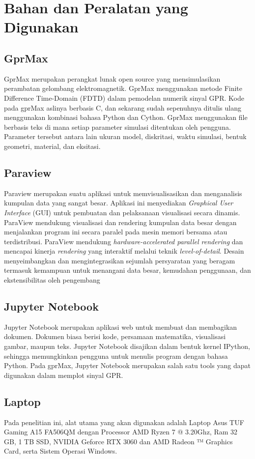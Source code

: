 \section{Bahan dan Peralatan yang Digunakan}
\label{sec:bahanPeralatan}

\subsection{GprMax}
\label{subsec:GprMax}

GprMax merupakan perangkat lunak open source yang mensimulasikan perambatan gelombang elektromagnetik. 
GprMax menggunakan metode Finite Difference Time-Domain (FDTD) dalam pemodelan numerik sinyal GPR. 
Kode pada gprMax aslinya berbasis C, dan sekarang sudah sepenuhnya ditulis ulang menggunakan kombinasi bahasa Python dan Cython. 
GprMax menggunakan file berbasis teks di mana setiap parameter simulasi ditentukan oleh pengguna. 
Parameter tersebut antara lain ukuran model, diskritasi, waktu simulasi, bentuk geometri, material, dan eksitasi.

\subsection{Paraview}
Paraview merupakan suatu aplikasi untuk memvisualisasikan dan menganalisis kumpulan data yang sangat besar. 
Aplikasi ini menyediakan \emph{Graphical User Interface} (GUI) untuk pembuatan dan pelaksanaan visualisasi secara dinamis. 
ParaView mendukung visualisasi dan rendering kumpulan data besar dengan menjalankan program ini secara paralel pada mesin memori bersama atau terdistribusi. 
ParaView mendukung \emph{hardware-accelerated parallel rendering} dan mencapai kinerja \emph{rendering} yang interaktif melalui teknik \emph{level-of-detail}. 
Desain menyeimbangkan dan mengintegrasikan sejumlah persyaratan yang beragam termasuk kemampuan untuk menangani data besar, kemudahan penggunaan, dan ekstensibilitas oleh pengembang \parencite{paraview}

\subsection{Jupyter Notebook}
\label{subsec:jupyter}

Jupyter Notebook merupakan aplikasi web untuk membuat dan membagikan dokumen. 
Dokumen biasa berisi kode, persamaan matematika, visualisasi gambar, maupun teks. 
Jupyter Notebook disajikan dalam bentuk kernel IPython, sehingga memungkinkan pengguna untuk menulis program dengan bahasa Python. 
Pada gprMax, Jupyter Notebook merupakan salah satu tools yang dapat digunakan dalam memplot sinyal GPR.

\subsection{Laptop}
\label{subsec:laptop}

Pada penelitian ini, alat utama yang akan digunakan adalah Laptop Asus TUF Gaming A15 FA506QM dengan Processor AMD Ryzen 7 @ 3.20Ghz, 
Ram 32 GB, 1 TB SSD, NVIDIA Geforce RTX 3060 dan AMD Radeon ™ Graphics Card, serta Sistem Operasi Windows.
